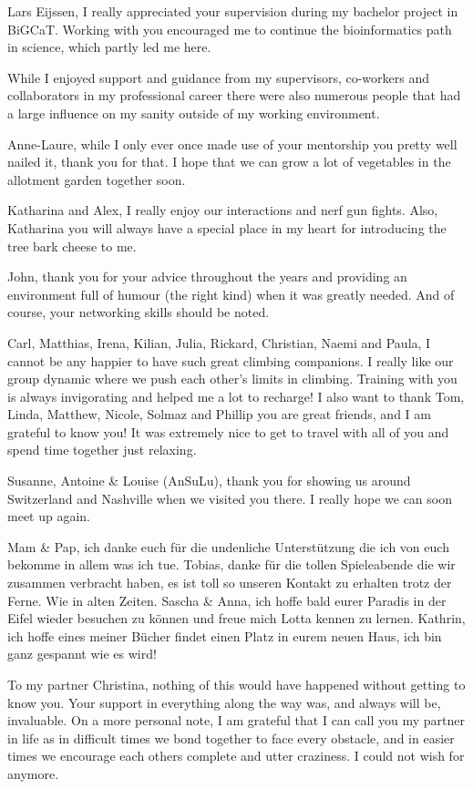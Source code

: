 \documentclass[
  12pt,
  openany]{book}
\begin{document}
Lars Eijssen, I really appreciated your supervision during my bachelor project in BiGCaT. Working with you encouraged me to continue the bioinformatics path in science, which partly led me here.

While I enjoyed support and guidance from my supervisors, co-workers and collaborators in my professional career there were also numerous people that had a large influence on my sanity outside of my working environment.

Anne-Laure, while I only ever once made use of your mentorship you pretty well nailed it, thank you for that. I hope that we can grow a lot of vegetables in the allotment garden together soon.

Katharina and Alex, I really enjoy our interactions and nerf gun fights. Also, Katharina you will always have a special place in my heart for introducing the tree bark cheese to me.

John, thank you for your advice throughout the years and providing an environment full of humour (the right kind) when it was greatly needed. And of course, your networking skills should be noted.

Carl, Matthias, Irena, Kilian, Julia, Rickard, Christian, Naemi and Paula, I cannot be any happier to have such great climbing companions. I really like our group dynamic where we push each other's limits in climbing. Training with you is always invigorating and helped me a lot to recharge!
I also want to thank Tom, Linda, Matthew, Nicole, Solmaz and Phillip you are great friends, and I am grateful to know you! It was extremely nice to get to travel with all of you and spend time together just relaxing.

Susanne, Antoine \& Louise (AnSuLu), thank you for showing us around Switzerland and Nashville when we visited you there. I really hope we can soon meet up again.

Mam \& Pap, ich danke euch für die undenliche Unterstützung die ich von euch bekomme in allem was ich tue. Tobias, danke für die tollen Spieleabende die wir zusammen verbracht haben, es ist toll so unseren Kontakt zu erhalten trotz der Ferne. Wie in alten Zeiten. Sascha \& Anna, ich hoffe bald eurer Paradis in der Eifel wieder besuchen zu können und freue mich Lotta kennen zu lernen. Kathrin, ich hoffe eines meiner Bücher findet einen Platz in eurem neuen Haus, ich bin ganz gespannt wie es wird!

To my partner Christina, nothing of this would have happened without getting to know you. Your support in everything along the way was, and always will be, invaluable. On a more personal note, I am grateful that I can call you my partner in life as in difficult times we bond together to face every obstacle, and in easier times we encourage each others complete and utter craziness. I could not wish for anymore.
\end{document}
